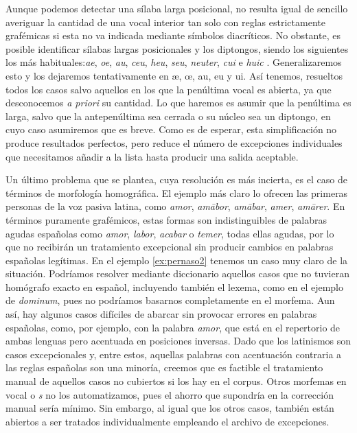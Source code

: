 Aunque podemos detectar una sílaba larga posicional, no resulta igual de sencillo averiguar la cantidad de una vocal interior tan solo con reglas estrictamente grafémicas si esta no va indicada mediante símbolos diacríticos. No obstante, es posible identificar sílabas largas posicionales y los diptongos, siendo los siguientes los más habituales:\textit{ae}, \textit{oe}, \textit{au}, \textit{ceu}, \textit{heu}, \textit{seu}, \textit{neuter}, \textit{cui} e \textit{huic} \parencite[28]{ceccarelli1999}. Generalizaremos esto y los dejaremos tentativamente en \textlangle{}æ\textrangle{},  \textlangle{}œ\textrangle{}, \textlangle{}au\textrangle{}, \textlangle{}eu\textrangle{} y \textlangle{}ui\textrangle{}. Así tenemos, resueltos todos los casos salvo aquellos en los que la penúltima vocal es abierta, ya que desconocemos \textit{a priori} su cantidad. Lo que haremos es asumir que la penúltima es larga, salvo que la antepenúltima sea cerrada o su núcleo sea un diptongo, en cuyo caso asumiremos que es breve. Como es de esperar, esta simplificación no produce resultados perfectos, pero reduce el número de excepciones individuales que necesitamos añadir a la lista hasta producir una salida aceptable.

Un último problema que se plantea, cuya resolución es más incierta, es el caso de términos de morfología homográfica. El ejemplo más claro lo ofrecen las primeras personas de la voz pasiva latina, como \textit{amor}, \textit{amābor}, \textit{amābar}, \textit{amer}, \textit{amārer}. En términos puramente grafémicos, estas formas son indistinguibles de palabras agudas españolas como \textit{amor}, \textit{labor}, \textit{acabar} o \textit{temer}, todas ellas agudas, por lo que no recibirán un tratamiento excepcional sin producir cambios en palabras españolas legítimas. En el ejemplo \ref{ex:pernaso2} tenemos un caso muy claro de la situación. Podríamos resolver mediante diccionario aquellos casos que no tuvieran homógrafo exacto en español, incluyendo también el lexema, como en el ejemplo de \textit{dominum}, pues no podríamos basarnos completamente en el morfema. Aun así, hay algunos casos difíciles de abarcar sin provocar errores en palabras españolas, como, por ejemplo, con la palabra \textit{amor}, que está en el repertorio de ambas lenguas pero acentuada en posiciones inversas. Dado que los latinismos son casos excepcionales y, entre estos, aquellas palabras con acentuación contraria a las reglas españolas son una minoría, creemos que es factible el tratamiento manual de aquellos casos no cubiertos si los hay en el corpus. Otros morfemas en vocal o \textit{s} no los automatizamos, pues el ahorro que supondría en la corrección manual sería mínimo. Sin embargo, al igual que los otros casos, también están abiertos a ser tratados individualmente empleando el archivo de excepciones.

